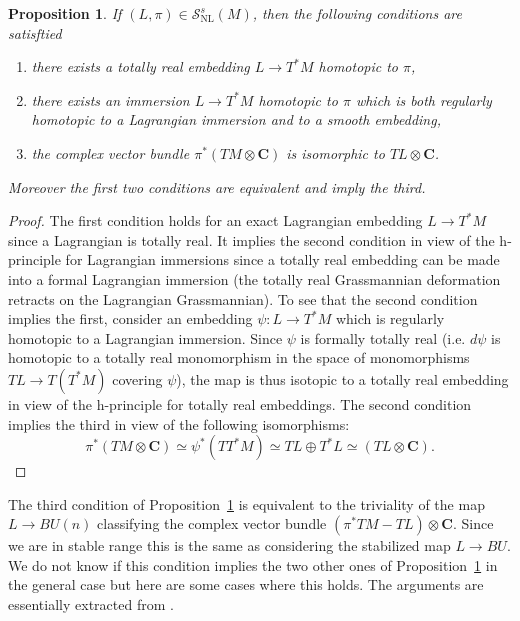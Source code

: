\documentclass[reqno]{amsart}
\theoremstyle{theorem}
\newtheorem{proposition}[corollary]{Proposition}
\theoremstyle{remark}
\theoremstyle{definition}
\newcommand{\NL}{\mathrm{NL}}
\newcommand{\C}{\mathbf{C}}
\renewcommand{\SS}{\mathcal{S}}
\begin{document}
\begin{proposition}\label{prop:soft}
If $(L,\pi)\in \SS^s_\NL(M)$, then the following conditions are satisftied
\begin{enumerate}
\item there exists a totally real embedding $L\to T^* M$ homotopic to $\pi$,
\item there exists an immersion $L \to T^* M$ homotopic to $\pi$ which is both regularly homotopic to a Lagrangian immersion and
to a smooth embedding,
\item the complex vector bundle $\pi^* (TM \otimes \C)$ is isomorphic to $TL \otimes \C$. 
\end{enumerate}
Moreover the first two conditions are equivalent and imply the third.
\end{proposition}
\begin{proof}
The first condition holds for an exact Lagrangian embedding $L\to T^* M$ since a Lagrangian is totally real.
It implies the second condition in view of the h-principle for Lagrangian immersions since a totally real embedding
can be made into a formal Lagrangian immersion (the totally real Grassmannian deformation retracts on the Lagrangian
Grassmannian). To see that the second condition implies the first, consider an embedding $\psi\colon L\to T^* M$ which is regularly homotopic to a Lagrangian immersion. Since $\psi$ is formally totally real (i.e. $d\psi$ is homotopic to a totally real monomorphism in the space of monomorphisms $TL \to T(T^*M)$
covering $\psi$), the map is thus isotopic to a totally real embedding in view of the h-principle for totally real embeddings.
The second condition implies the third in view of the following isomorphisms:
\[\pi^* (TM\otimes \C) \simeq\psi^*(TT^* M)\simeq TL\oplus T^* L \simeq (TL\otimes \C).\]
\end{proof}


The third condition of Proposition~\ref{prop:soft} is equivalent to the triviality of
the map $L\to BU(n)$ classifying the complex vector bundle $(\pi^*TM -TL)\otimes \C$.
Since we are in stable range this is the same as considering the stabilized map $L\to BU$.
We do not know if this condition implies the two other ones
of Proposition~\ref{prop:soft} in the general case but here are some cases
where this holds. The arguments are essentially extracted from \cite{A88}.
\end{document}

